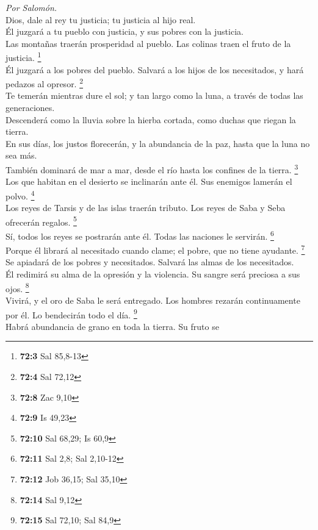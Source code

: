 \emph{Por Salomón.}\\
 Dios, dale al rey tu justicia; tu justicia al hijo
real.\\
 Él juzgará a tu pueblo con justicia, y sus pobres con la
justicia.\\
 Las montañas traerán prosperidad al pueblo. Las colinas
traen el fruto de la justicia. \footnote{\textbf{72:3} Sal 85,8-13}\\
 Él juzgará a los pobres del pueblo. Salvará a los hijos
de los necesitados, y hará pedazos al opresor. \footnote{\textbf{72:4}
  Sal 72,12}\\
 Te temerán mientras dure el sol; y tan largo como la
luna, a través de todas las generaciones.\\
 Descenderá como la lluvia sobre la hierba cortada, como
duchas que riegan la tierra.\\
 En sus días, los justos florecerán, y la abundancia de la
paz, hasta que la luna no sea más.\\
 También dominará de mar a mar, desde el río hasta los
confines de la tierra. \footnote{\textbf{72:8} Zac 9,10}\\
 Los que habitan en el desierto se inclinarán ante él. Sus
enemigos lamerán el polvo. \footnote{\textbf{72:9} Is 49,23}\\
 Los reyes de Tarsis y de las islas traerán tributo. Los
reyes de Saba y Seba ofrecerán regalos. \footnote{\textbf{72:10} Sal
  68,29; Is 60,9}\\
 Sí, todos los reyes se postrarán ante él. Todas las
naciones le servirán. \footnote{\textbf{72:11} Sal 2,8; Sal 2,10-12}\\
 Porque él librará al necesitado cuando clame; el pobre,
que no tiene ayudante. \footnote{\textbf{72:12} Job 36,15; Sal 35,10}\\
 Se apiadará de los pobres y necesitados. Salvará las
almas de los necesitados.\\
 Él redimirá su alma de la opresión y la violencia. Su
sangre será preciosa a sus ojos. \footnote{\textbf{72:14} Sal 9,12}\\
 Vivirá, y el oro de Saba le será entregado. Los hombres
rezarán continuamente por él. Lo bendecirán todo el día. \footnote{\textbf{72:15}
  Sal 72,10; Sal 84,9}\\
 Habrá abundancia de grano en toda la tierra. Su fruto se
